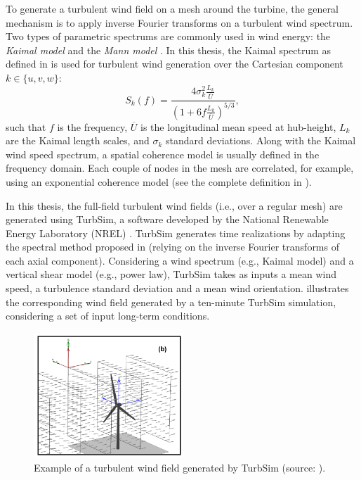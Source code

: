 To generate a turbulent wind field on a mesh around the turbine, the general mechanism is to apply inverse Fourier transforms on a turbulent wind spectrum.  
Two types of parametric spectrums are commonly used in wind energy: the \textit{Kaimal model} \citep{kaimal_1972} and the \textit{Mann model} \citep{mann_1998}. 
In this thesis, the Kaimal spectrum as defined in \cite{iec_2019} is used for turbulent wind generation over the Cartesian component $k \in \{u, v, w\}$:
\begin{equation}
    S_k(f) = \frac{4 \sigma_k^2 \frac{L_k}{\overline{U}}}{\left(1 + 6 f \frac{L_k}{\overline{U}}\right)^{5/3}},
    \label{eq:kaimal}
\end{equation} 
such that $f$ is the frequency, $\overline{U}$ is the longitudinal mean speed at hub-height, $L_k$ are the Kaimal length scales, and $\sigma_k$ standard deviations. 
Along with the Kaimal wind speed spectrum, a spatial coherence model is usually defined in the frequency domain. 
Each couple of nodes in the mesh are correlated, for example, using an exponential coherence model (see the complete definition in \citealp[Appendix C]{iec_2019}).

In this thesis, the full-field turbulent wind fields (i.e., over a regular mesh) are generated using TurbSim, a software developed by the National Renewable Energy Laboratory (NREL) \citep{turbsim_2009}. 
TurbSim generates time realizations by adapting the spectral method proposed in \citet{veers_1988_sandia} (relying on the inverse Fourier transforms of each axial component).   
Considering a wind spectrum (e.g., Kaimal model) and a vertical shear model (e.g., power law), TurbSim takes as inputs a mean wind speed, a turbulence standard deviation and a mean wind orientation. 
 illustrates the corresponding wind field generated by a ten-minute TurbSim simulation, considering a set of input long-term conditions. 

\begin{figure}
    \centering
    \includegraphics[width=0.5\textwidth]{./part1/figures/turbsim.png}
    \caption{Example of a turbulent wind field generated by TurbSim (source: \citealp{turbsim_2009}).}
    \label{fig:turbsim_simu}
\end{figure}

